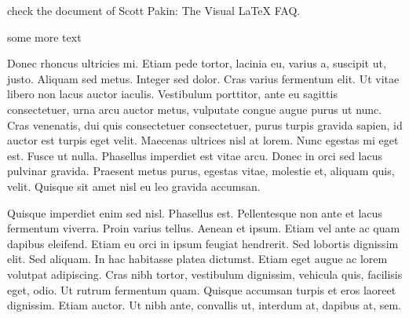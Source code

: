 \documentclass[12pt]{article}
\begin{document}



check the document of Scott Pakin: The Visual LaTeX FAQ.

\vspace{10mm}
some more text


\noindent
Donec rhoncus ultricies mi. Etiam pede tortor, lacinia eu, varius a, suscipit ut, justo. Aliquam sed metus. Integer sed dolor. Cras varius fermentum elit. Ut vitae libero non lacus auctor iaculis. Vestibulum porttitor, ante eu sagittis consectetuer, urna arcu auctor metus, vulputate congue augue purus ut nunc. Cras venenatis, dui quis consectetuer consectetuer, purus turpis gravida sapien, id auctor est turpis eget velit. Maecenas ultrices nisl at lorem. Nunc egestas mi eget est. Fusce ut nulla. Phasellus imperdiet est vitae arcu. Donec in orci sed lacus pulvinar gravida. Praesent metus purus, egestas vitae, molestie et, aliquam quis, velit. Quisque sit amet nisl eu leo gravida accumsan.

Quisque imperdiet enim sed nisl. Phasellus est. Pellentesque non ante et lacus fermentum viverra. Proin varius tellus. Aenean et ipsum. Etiam vel ante ac quam dapibus eleifend. Etiam eu orci in ipsum feugiat hendrerit. Sed lobortis dignissim elit. Sed aliquam. In hac habitasse platea dictumst. Etiam eget augue ac lorem volutpat adipiscing. Cras nibh tortor, vestibulum dignissim, vehicula quis, facilisis eget, odio. Ut rutrum fermentum quam. Quisque accumsan turpis et eros laoreet dignissim. Etiam auctor. Ut nibh ante, convallis ut, interdum at, dapibus at, sem.
\end{document}
